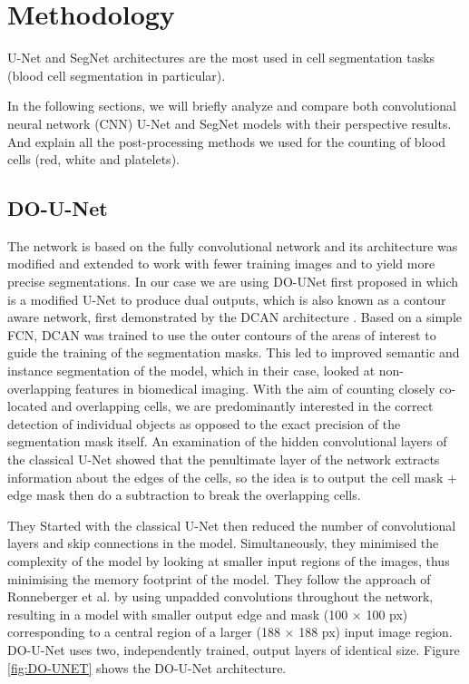 \documentclass[conference]{IEEEtran}
\begin{document}
\section{Methodology}
U-Net and SegNet architectures are the most used in cell segmentation tasks (blood cell segmentation in particular).

In the following sections, we will briefly analyze and compare both convolutional neural network (CNN) U-Net and SegNet models with their perspective results.
And explain all the post-processing methods we used for the counting of blood cells (red, white and platelets).

\subsection{DO-U-Net}
The network is based on the fully convolutional network and its architecture was modified and extended to work with fewer training images and to yield more precise segmentations. In our case we are using DO-UNet first proposed in \cite{10.1007/978-3-030-44584-3_31} which is a modified U-Net to produce dual outputs, which is also known as a contour aware network, first demonstrated by the DCAN architecture \cite{chen2016dcan}. Based on a simple FCN, DCAN was trained to use the outer
contours of the areas of interest to guide the training of the segmentation masks. This led to improved semantic and instance segmentation of the model, which in their case, looked at non-overlapping features in biomedical imaging.
With the aim of counting closely co-located and overlapping cells, we are predominantly interested in the correct detection of individual objects as
opposed to the exact precision of the segmentation mask itself. An examination of the hidden convolutional layers of the classical U-Net showed that the penultimate layer of the network extracts information about the edges of the cells, so the idea is to output the cell mask + edge mask then do a subtraction to break the overlapping cells.

They Started with the classical U-Net then reduced the number of convolutional layers and skip connections in the model. Simultaneously, they minimised the complexity of the model by looking at smaller input regions of the images, thus minimising the memory footprint of the model. They follow the approach of Ronneberger et al. \cite{10.1007/978-3-030-44584-3_31} by using unpadded convolutions throughout the network, resulting in a model with smaller output edge and mask (100 × 100 px) corresponding to a central region of a larger (188 × 188 px) input image region. DO-U-Net uses two, independently trained, output layers of identical size. Figure \ref{fig:DO-UNET} shows the DO-U-Net architecture.
\end{document}

